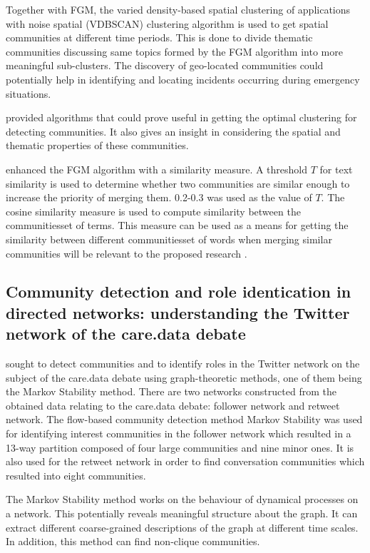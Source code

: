 Together with FGM, the varied density-based spatial clustering of applications with noise spatial (VDBSCAN) clustering algorithm is used to get spatial communities at different time periods. This is done to divide thematic communities discussing same topics formed by the FGM algorithm into more meaningful sub-clusters. The discovery of geo-located communities could potentially help in identifying and locating incidents occurring during emergency situations.


 provided algorithms that could prove useful in getting the optimal clustering for detecting communities. It also gives an insight in considering the spatial and thematic properties of these communities.


 enhanced the FGM algorithm with a similarity measure. A threshold $T$ for text similarity is used to determine whether two communities are similar enough to increase the priority of merging them. 0.2-0.3 was used as the value of $T$. The cosine similarity measure is used to compute similarity between the communities\vtick set of terms. This measure can be used as a means for getting the similarity between different communities\vtick set of words when merging similar communities will be relevant to the proposed research \cite{Bakillah:2014}.


\subsection{Community detection and role identication in directed networks: understanding the Twitter network of the care.data debate}


 sought to detect communities and to identify roles in the Twitter network on the subject of the care.data debate using graph-theoretic methods, one of them being the Markov Stability method. There are two networks constructed from the obtained data relating to the care.data debate: follower network and retweet network. The flow-based community detection method Markov Stability was used for identifying interest communities in the follower network which resulted in a 13-way partition composed of four large communities and nine minor ones. It is also used for the retweet network in order to find conversation communities which resulted into eight communities. 


The Markov Stability method works on the behaviour of dynamical processes on a network. This potentially reveals meaningful structure about the graph. It can extract different coarse-grained descriptions of the graph at different time scales. In addition, this method can find non-clique communities.



